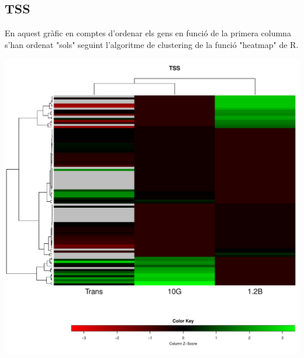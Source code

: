 \documentclass{article}\usepackage[]{graphicx}\usepackage[]{color}
\newenvironment{knitrout}{}{} %
\begin{document}
\subsection{TSS}
En aquest gràfic en comptes d'ordenar els gens en funció de la primera columna s'han ordenat "sols" seguint l'algoritme de clustering de la funció "heatmap" de R.
\begin{knitrout}
\color{fgcolor}

{\centering \includegraphics[width=.9\linewidth]{figure/minimal-heatmap_tss-1} 

}



\end{knitrout}
\clearpage
\end{document}
